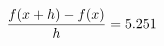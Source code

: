 \documentclass[preview]{standalone}
\begin{document}
\begin{align*}
\special{dvisvgm:raw <g id='unique000'>}\frac{f(x+h)-f(x)}{h} = 5.251\special{dvisvgm:raw </g>}
\end{align*}
\end{document}

